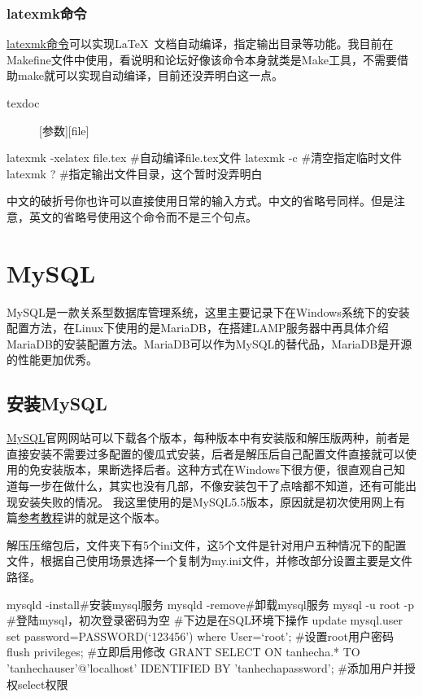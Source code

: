\subsubsection{latexmk命令}
	\href{https://blog.csdn.net/bleedingfight/article/details/84946793?ops_request_misc=%257B%2522request%255Fid%2522%253A%2522a782193c5e5af7bfb740173a44657da1%2522%252C%2522scm%2522%253A%252220140713.130102334..%2522%257D&request_id=a782193c5e5af7bfb740173a44657da1&biz_id=0&utm_medium=distribute.pc_search_result.none-task-blog-2~all~sobaiduend~default-1-84946793-null-null.142^v101^pc_search_result_base7&utm_term=latexmk&spm=1018.2226.3001.4187}{latexmk命令}可以实现\LaTeX\ 文档自动编译，指定输出目录等功能。我目前在Makefine文件中使用，看说明和论坛好像该命令本身就类是Make工具，不需要借助make就可以实现自动编译，目前还没弄明白这一点。
	\begin{description}
		\item[texdoc] [参数][file]
	\end{description}
\begin{shell}
latexmk -xelatex file.tex #自动编译file.tex文件
latexmk -c #清空指定临时文件
latexmk ? #指定输出文件目录，这个暂时没弄明白
\end{shell}

中文的破折号你也许可以直接使用日常的输入方式。中文的省略号同样。但是注意，英文的省略号使用这个命令而不是三个句点。
\section{MySQL}
MySQL是一款关系型数据库管理系统，这里主要记录下在Windows系统下的安装配置方法，在Linux下使用的是MariaDB，在搭建LAMP服务器中再具体介绍MariaDB的安装配置方法。MariaDB可以作为MySQL的替代品，MariaDB是开源的性能更加优秀。
\subsection{安装MySQL}
\href{https://downloads.mysql.com/archives/community/}{MySQL}官网网站可以下载各个版本，每种版本中有安装版和解压版两种，前者是直接安装不需要过多配置的傻瓜式安装，后者是解压后自己配置文件直接就可以使用的免安装版本，果断选择后者。这种方式在Windows下很方便，很直观自己知道每一步在做什么，其实也没有几部，不像安装包干了点啥都不知道，还有可能出现安装失败的情况。
我这里使用的是MySQL5.5版本，原因就是初次使用网上有篇\href{https://blog.csdn.net/qq_30061785/article/details/102504115?spm=1001.2014.3001.5506}{参考教程}讲的就是这个版本。

解压压缩包后，文件夹下有5个ini文件，这5个文件是针对用户五种情况下的配置文件，根据自己使用场景选择一个复制为my.ini文件，并修改部分设置主要是文件路径。
\begin{shell}
mysqld -install#安装mysql服务
mysqld -remove#卸载mysql服务
mysql -u root -p #登陆mysql，初次登录密码为空
#下边是在SQL环境下操作
update mysql.user set password=PASSWORD(‘123456’) where User=‘root’;
#设置root用户密码
flush privileges;
#立即启用修改
GRANT SELECT ON tanhecha.* TO 'tanhechauser'@'localhost' IDENTIFIED BY 'tanhechapassword';
#添加用户并授权select权限
\end{shell}
